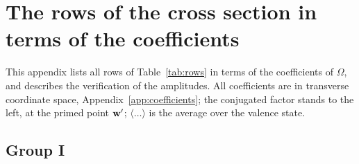 \section{The rows of the cross section in terms of the coefficients}\label{app:rows}

This appendix lists all rows of Table~\ref{tab:rows} in terms of the coefficients of $\Omega$, and describes the verification of the amplitudes. All coefficients are in transverse coordinate space, Appendix~\ref{app:coefficients}; the conjugated factor stands to the left, at the primed point $\mathbf{w}'$; $\langle\dots\rangle$ is the average over the valence state.

\subsection{Group I}

